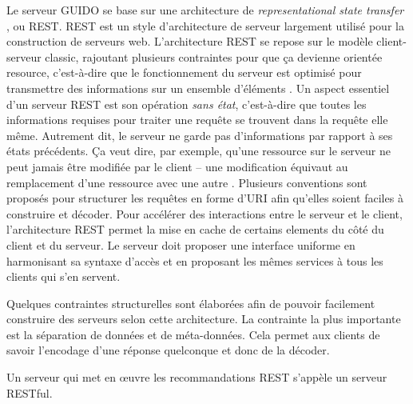 \documentclass{article}
\begin{document}
Le serveur GUIDO se base sur une architecture de \emph{representational state transfer} \cite{Fielding00}, ou REST. REST est un style d'architecture de serveur largement utilisé pour la construction de serveurs web. L'architecture REST se repose sur le modèle client-serveur classic, rajoutant plusieurs contraintes pour que ça devienne \og{}orientée resource\fg{}, c'est-à-dire que le fonctionnement du serveur est optimisé pour transmettre des informations sur un ensemble d'éléments \cite{richardson2008restful}. Un aspect essentiel d'un serveur REST est son opération \emph{sans état}, c'est-à-dire que toutes les informations requises pour traiter une requête se trouvent dans la requête elle même. Autrement dit, le serveur ne garde pas d'informations par rapport à ses états précédents. Ça veut dire, par exemple, qu'une ressource sur le serveur ne peut jamais être modifiée par le client -- une modification équivaut au remplacement d'une ressource avec une autre \cite{richardson2008restful}. Plusieurs conventions \cite{richardson2008restful} sont proposés pour structurer les requêtes en forme d'URI afin qu'elles soient faciles à construire et décoder. Pour accélérer des interactions entre le serveur et le client, l'architecture REST permet la mise en cache de certains elements du côté du client et du serveur. Le serveur doit proposer une interface uniforme en harmonisant sa syntaxe d'accès et en proposant les mêmes services à tous les clients qui s'en servent.\par
Quelques contraintes structurelles sont élaborées afin de pouvoir facilement construire des serveurs selon cette architecture. La contrainte la plus importante est la séparation de données et de méta-données. Cela permet aux clients de savoir l'encodage d'une réponse quelconque et donc de la décoder.\par
Un serveur qui met en \oe{}uvre les recommandations REST s'appèle un serveur RESTful.
\end{document}
